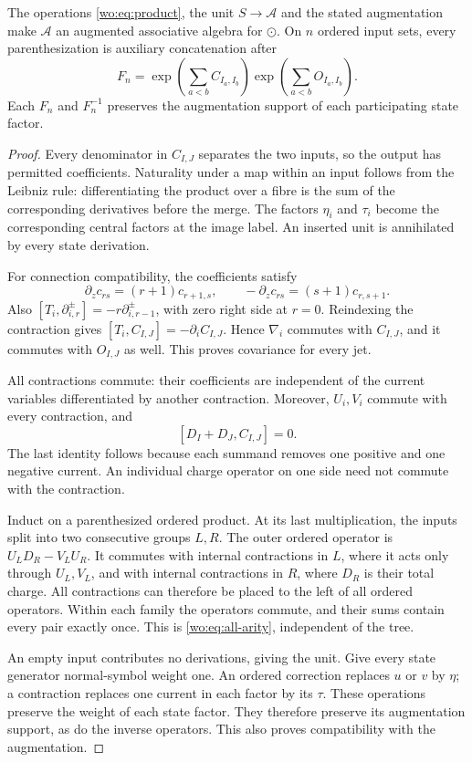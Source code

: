 \begin{proposition}
\label{wo:prop:algebra}
The operations \eqref{wo:eq:product}, the unit \(S\to\mathcal A\)
and the stated augmentation make \(\mathcal A\) an augmented
associative algebra for \(\odot\).  On \(n\) ordered input sets,
every parenthesization is auxiliary concatenation after
\begin{equation}\label{wo:eq:all-arity}
 F_n=\exp\left(\sum_{a<b}C_{I_a,I_b}\right)
       \exp\left(\sum_{a<b}O_{I_a,I_b}\right).
\end{equation}
Each \(F_n\) and \(F_n^{-1}\) preserves the augmentation support
of each participating state factor.
\end{proposition}
\begin{proof}
Every denominator in \(C_{I,J}\) separates the two inputs, so the
output has permitted coefficients.  Naturality under a map within
an input follows from the Leibniz rule: differentiating the product
over a fibre is the sum of the corresponding derivatives before
the merge.  The factors \(\eta_i\) and \(\tau_i\) become the
corresponding central factors at the image label.  An inserted unit
is annihilated by every state derivation.

For connection compatibility, the coefficients satisfy
\[
 \partial_z c_{rs}=(r+1)c_{r+1,s},\qquad
 -\partial_z c_{rs}=(s+1)c_{r,s+1}.
\]
Also \([T_i,\partial_{i,r}^\pm]=-r\partial_{i,r-1}^\pm\),
with zero right side at \(r=0\).  Reindexing the contraction gives
\([T_i,C_{I,J}]=-\partial_i C_{I,J}\).  Hence
\(\nabla_i\) commutes with \(C_{I,J}\), and it commutes with
\(O_{I,J}\) as well.  This proves covariance for every jet.

All contractions commute: their coefficients are independent of
the current variables differentiated by another contraction.
Moreover, \(U_i,V_i\) commute with every contraction, and
\[
 [D_I+D_J,C_{I,J}]=0.
\]
The last identity follows because each summand removes one positive
and one negative current.  An individual charge operator on one
side need not commute with the contraction.

Induct on a parenthesized ordered product.  At its last multiplication,
the inputs split into two consecutive groups \(L,R\).  The outer
ordered operator is \(U_LD_R-V_LU_R\).  It commutes with internal
contractions in \(L\), where it acts only through \(U_L,V_L\),
and with internal contractions in \(R\), where \(D_R\) is their
total charge.  All contractions can therefore be placed to the left
of all ordered operators.  Within each family the operators commute,
and their sums contain every pair exactly once.  This is
\eqref{wo:eq:all-arity}, independent of the tree.

An empty input contributes no derivations, giving the unit.
Give every state generator normal-symbol weight one.  An ordered
correction replaces \(u\) or \(v\) by \(\eta\); a contraction
replaces one current in each factor by its \(\tau\).  These
operations preserve the weight of each state factor.  They therefore
preserve its augmentation support, as do the inverse operators.
This also proves compatibility with the augmentation.
\end{proof}

